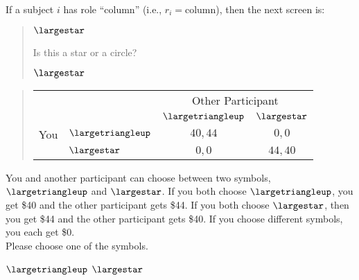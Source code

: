 \documentclass[11pt]{article}
\begin{document}
If a subject $i$ has role ``column'' (i.e., $r_i=\text{column}$), then the next screen is:
\begin{tcolorbox}
\begin{quote}
\begin{center}
{\Huge $\largestar$}
\end{center}
 \centering Is this a star or a circle?

 \begin{center}
$\largestar$ \qquad \textbigcircle
\end{center}
\end{quote}

\begin{quote}
\begin{center}
\begin{tabular}{llcc}
    & & \multicolumn{2}{c}{Other Participant}  \\
& & $\largetriangleup$ & $\largestar$  \\ \cline{3-4}
You & $\largetriangleup$ & \multicolumn{1}{|c|}{$40,44$} & \multicolumn{1}{c|}{$0,0$}  \\ \cline{3-4}
& $\largestar$ & \multicolumn{1}{|c|}{$0,0$} & \multicolumn{1}{c|}{$44,40$}  \\ \cline{3-4}
\end{tabular}
\end{center}
\end{quote}

You and another participant can choose between two symbols, $\largetriangleup$ and $\largestar$. If you both choose $\largetriangleup$, you get \$40 and the other participant gets \$44. If you both choose $\largestar$, then you get \$44 and the other participant gets \$40. If you choose different symbols, you each get \$0.\\

Please choose one of the symbols.\\

\begin{center}
$\largetriangleup$ \qquad $\largestar$
\end{center}
\end{tcolorbox}
\end{document}
